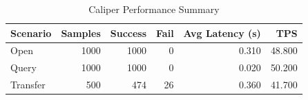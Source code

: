 \begin{table}
\caption{Caliper Performance Summary}
\label{tab:caliper_round}
\begin{tabular}{lrrrrr}
\toprule
Scenario & Samples & Success & Fail & Avg Latency (s) & TPS \\
\midrule
Open & 1000 & 1000 & 0 & 0.310 & 48.800 \\
Query & 1000 & 1000 & 0 & 0.020 & 50.200 \\
Transfer & 500 & 474 & 26 & 0.360 & 41.700 \\
\bottomrule
\end{tabular}
\end{table}
